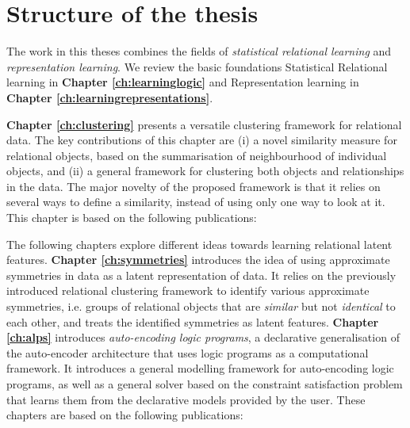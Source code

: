 



\section{Structure of the thesis}


The work in this theses combines the fields of \textit{statistical relational learning} and \textit{representation learning}.
We review the basic foundations Statistical Relational learning in \textbf{Chapter \ref{ch:learninglogic}} and Representation learning in \textbf{Chapter \ref{ch:learningrepresentations}}.


\textbf{Chapter \ref{ch:clustering}} presents a versatile clustering framework for relational data.
The key contributions of this chapter are (i) a novel similarity measure for relational objects, based on the summarisation of neighbourhood of individual objects, and (ii) a general framework for clustering both objects and relationships in the data.
The major novelty of the proposed framework is that it relies on several ways to define a similarity, instead of using only one way to look at it.
This chapter is based on the following publications:

\begin{quote}
\end{quote}

\begin{quote}
\end{quote}



The following chapters explore different ideas towards learning relational latent features.
\textbf{Chapter \ref{ch:symmetries}} introduces the idea of using approximate symmetries in data as a latent representation of data.
It relies on the previously introduced relational clustering framework to identify various approximate symmetries, i.e. groups of relational objects that are \textit{similar} but not \textit{identical} to each other, and treats the identified symmetries as latent features.
\textbf{Chapter \ref{ch:alps}} introduces \textit{auto-encoding logic programs}, a declarative generalisation of the auto-encoder architecture \cite{Hinton504} that uses logic programs as a computational framework.
It introduces a general modelling framework for auto-encoding logic programs, as well as a general solver based on the constraint satisfaction problem that learns them from the declarative models provided by the user.
These chapters are based on the following publications:

